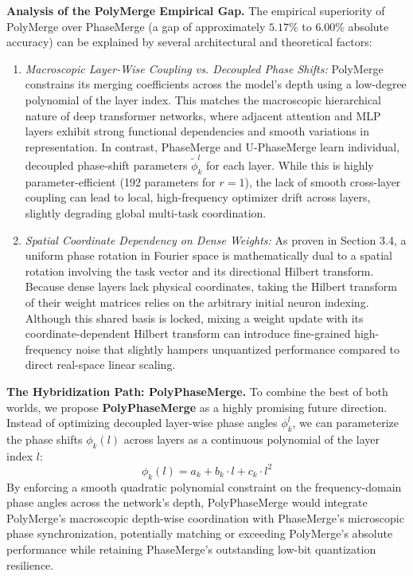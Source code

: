 \textbf{Analysis of the PolyMerge Empirical Gap.} The empirical superiority of PolyMerge over PhaseMerge (a gap of approximately $5.17\%$ to $6.00\%$ absolute accuracy) can be explained by several architectural and theoretical factors:
\begin{enumerate}
    \item \emph{Macroscopic Layer-Wise Coupling vs. Decoupled Phase Shifts:} PolyMerge constrains its merging coefficients across the model's depth using a low-degree polynomial of the layer index. This matches the macroscopic hierarchical nature of deep transformer networks, where adjacent attention and MLP layers exhibit strong functional dependencies and smooth variations in representation. In contrast, PhaseMerge and U-PhaseMerge learn individual, decoupled phase-shift parameters $\tilde{\phi}_k^l$ for each layer. While this is highly parameter-efficient (192 parameters for $r=1$), the lack of smooth cross-layer coupling can lead to local, high-frequency optimizer drift across layers, slightly degrading global multi-task coordination.
    \item \emph{Spatial Coordinate Dependency on Dense Weights:} As proven in Section 3.4, a uniform phase rotation in Fourier space is mathematically dual to a spatial rotation involving the task vector and its directional Hilbert transform. Because dense layers lack physical coordinates, taking the Hilbert transform of their weight matrices relies on the arbitrary initial neuron indexing. Although this shared basis is locked, mixing a weight update with its coordinate-dependent Hilbert transform can introduce fine-grained high-frequency noise that slightly hampers unquantized performance compared to direct real-space linear scaling.
\end{enumerate}

\textbf{The Hybridization Path: PolyPhaseMerge.} To combine the best of both worlds, we propose \textbf{PolyPhaseMerge} as a highly promising future direction. Instead of optimizing decoupled layer-wise phase angles $\phi_k^l$, we can parameterize the phase shifts $\phi_k(l)$ across layers as a continuous polynomial of the layer index $l$:
\begin{equation}
    \phi_k(l) = a_k + b_k \cdot l + c_k \cdot l^2
\end{equation}
By enforcing a smooth quadratic polynomial constraint on the frequency-domain phase angles across the network's depth, PolyPhaseMerge would integrate PolyMerge's macroscopic depth-wise coordination with PhaseMerge's microscopic phase synchronization, potentially matching or exceeding PolyMerge's absolute performance while retaining PhaseMerge's outstanding low-bit quantization resilience.

